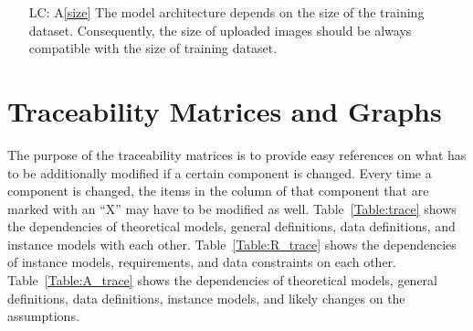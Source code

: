 \documentclass[12pt]{article}
\newcommand{\aref}[1]{A\ref{#1}}
\newcounter{lcnum} %
\begin{document}
\noindent \begin{itemize}

\item[LC\refstepcounter{lcnum}\thelcnum\label{LC_size}:] 
\aref{size} The model architecture depends on the size of the training dataset. 
Consequently, the size of uploaded images should be always compatible with the size 
of training dataset.

\end{itemize}

\section{Traceability Matrices and Graphs}

The purpose of the traceability matrices is to provide easy references on what
has to be additionally modified if a certain component is changed.  Every time a
component is changed, the items in the column of that component that are marked
with an ``X'' may have to be modified as well.  Table~\ref{Table:trace} shows the
dependencies of theoretical models, general definitions, data definitions, and
instance models with each other. Table~\ref{Table:R_trace} shows the
dependencies of instance models, requirements, and data constraints on each
other. Table~\ref{Table:A_trace} shows the dependencies of theoretical models,
general definitions, data definitions, instance models, and likely changes on
the assumptions.



\end{document}
